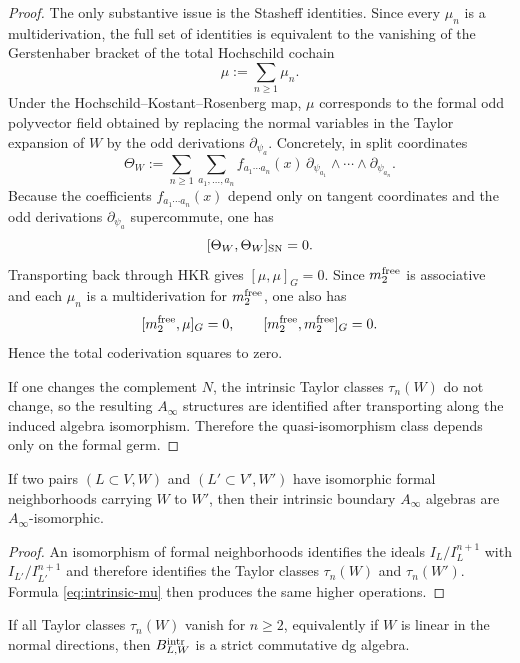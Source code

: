 \begin{proof}
The only substantive issue is the Stasheff identities. Since every $\mu_n$ is a multiderivation, the full set of identities is equivalent to the vanishing of the Gerstenhaber bracket of the total Hochschild cochain
\[
\mu:=\sum_{n\ge 1}\mu_n.
\]
Under the Hochschild--Kostant--Rosenberg map, $\mu$ corresponds to the formal odd polyvector field obtained by replacing the normal variables in the Taylor expansion of $W$ by the odd derivations $\partial_{\psi_a}$. Concretely, in split coordinates
\[
\Theta_W:=\sum_{n\ge 1}
\sum_{a_1,\dots,a_n}
f_{a_1\cdots a_n}(x)\,
\partial_{\psi_{a_1}}\wedge\cdots\wedge \partial_{\psi_{a_n}}.
\]
Because the coefficients $f_{a_1\cdots a_n}(x)$ depend only on tangent coordinates and the odd derivations $\partial_{\psi_a}$ supercommute, one has
\[
[\Theta_W,\Theta_W]_{\mathrm{SN}}=0.
\]
Transporting back through HKR gives $[\mu,\mu]_G=0$. Since $m_2^{\mathrm{free}}$ is associative and each $\mu_n$ is a multiderivation for $m_2^{\mathrm{free}}$, one also has
\[
[m_2^{\mathrm{free}},\mu]_G=0,
\qquad
[m_2^{\mathrm{free}},m_2^{\mathrm{free}}]_G=0.
\]
Hence the total coderivation squares to zero.

If one changes the complement $N$, the intrinsic Taylor classes $\tau_n(W)$ do not change, so the resulting $A_\infty$ structures are identified after transporting along the induced algebra isomorphism. Therefore the quasi-isomorphism class depends only on the formal germ.
\end{proof}

\begin{corollary}%
If two pairs $(L\subset V,W)$ and $(L'\subset V',W')$ have isomorphic formal neighborhoods carrying $W$ to $W'$, then their intrinsic boundary $A_\infty$ algebras are $A_\infty$-isomorphic.
\end{corollary}

\begin{proof}
An isomorphism of formal neighborhoods identifies the ideals $I_L/I_L^{n+1}$ with $I_{L'}/I_{L'}^{n+1}$ and therefore identifies the Taylor classes $\tau_n(W)$ and $\tau_n(W')$. Formula \eqref{eq:intrinsic-mu} then produces the same higher operations.
\end{proof}

\begin{corollary}%
If all Taylor classes $\tau_n(W)$ vanish for $n\ge 2$, equivalently if $W$ is linear in the normal directions, then $B^{\mathrm{intr}}_{L,W}$ is a strict commutative dg algebra.
\end{corollary}

